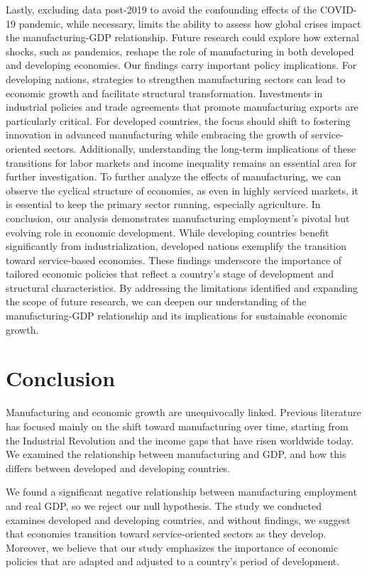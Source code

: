 \documentclass[12pt]{article}
\begin{document}
    Lastly, excluding data post-2019 to avoid the confounding effects of the COVID-19 pandemic, while necessary, limits the ability to assess how global crises impact the manufacturing-GDP relationship. Future research could explore how external shocks, such as pandemics, reshape the role of manufacturing in both developed and developing economies.
    Our findings carry important policy implications. For developing nations, strategies to strengthen manufacturing sectors can lead to economic growth and facilitate structural transformation. Investments in industrial policies and trade agreements that promote manufacturing exports are particularly critical. For developed countries, the focus should shift to fostering innovation in advanced manufacturing while embracing the growth of service-oriented sectors. Additionally, understanding the long-term implications of these transitions for labor markets and income inequality remains an essential area for further investigation. To further analyze the effects of manufacturing, we can observe the cyclical structure of economies, as even in highly serviced markets, it is essential to keep the primary sector running, especially agriculture. 
    In conclusion, our analysis demonstrates manufacturing employment's pivotal but evolving role in economic development. While developing countries benefit significantly from industrialization, developed nations exemplify the transition toward service-based economies. These findings underscore the importance of tailored economic policies that reflect a country's stage of development and structural characteristics. By addressing the limitations identified and expanding the scope of future research, we can deepen our understanding of the manufacturing-GDP relationship and its implications for sustainable economic growth.


\section{Conclusion}
\label{sec:conclusion}

Manufacturing and economic growth are unequivocally linked. Previous literature has focused mainly on the shift toward manufacturing over time, starting from the Industrial Revolution and the income gaps that have risen worldwide today.  We examined the relationship between manufacturing and GDP, and how this differs between developed and developing countries.

We found a significant negative relationship between manufacturing employment and real GDP, so we reject our null hypothesis. The study we conducted examines developed and developing countries, and without findings, we suggest that economies transition toward service-oriented sectors as they develop. Moreover, we believe that our study emphasizes the importance of economic policies that are adapted and adjusted to a country's period of development. 
\end{document}
